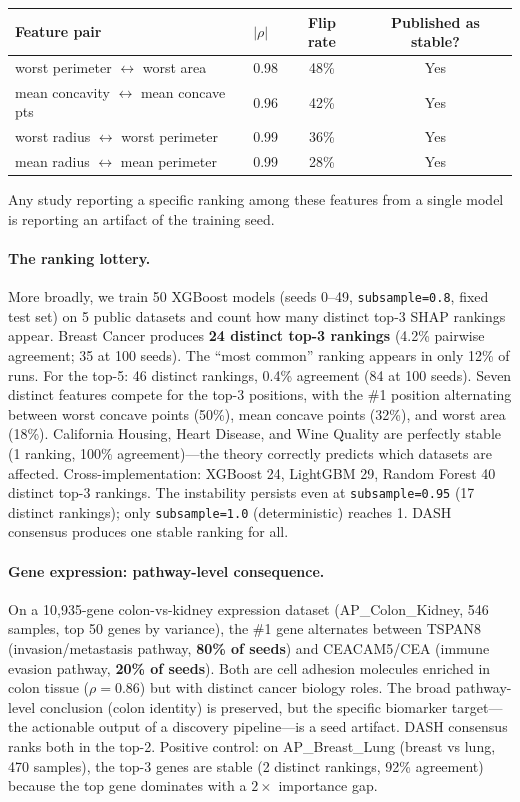 \documentclass{jmlr}
\begin{document}
\begin{center}
\small
\begin{tabular}{@{}llcc@{}}
\toprule
Feature pair & $|\rho|$ & Flip rate & Published as stable? \\
\midrule
worst perimeter $\leftrightarrow$ worst area & 0.98 & 48\% & Yes \\
mean concavity $\leftrightarrow$ mean concave pts & 0.96 & 42\% & Yes \\
worst radius $\leftrightarrow$ worst perimeter & 0.99 & 36\% & Yes \\
mean radius $\leftrightarrow$ mean perimeter & 0.99 & 28\% & Yes \\
\bottomrule
\end{tabular}
\end{center}

Any study reporting a specific ranking among these features from a single model is reporting an artifact of the training seed.

\paragraph{The ranking lottery.}
More broadly, we train 50 XGBoost models (seeds 0--49, \texttt{subsample=0.8}, fixed test set) on 5 public datasets and count how many distinct top-3 SHAP rankings appear. Breast Cancer produces \textbf{24 distinct top-3 rankings} (4.2\% pairwise agreement; 35 at 100 seeds). The ``most common'' ranking appears in only 12\% of runs. For the top-5: 46 distinct rankings, 0.4\% agreement (84 at 100 seeds). Seven distinct features compete for the top-3 positions, with the \#1 position alternating between worst concave points (50\%), mean concave points (32\%), and worst area (18\%). California Housing, Heart Disease, and Wine Quality are perfectly stable (1 ranking, 100\% agreement)---the theory correctly predicts which datasets are affected. Cross-implementation: XGBoost 24, LightGBM 29, Random Forest 40 distinct top-3 rankings. The instability persists even at \texttt{subsample=0.95} (17 distinct rankings); only \texttt{subsample=1.0} (deterministic) reaches 1. DASH consensus produces one stable ranking for all.

\paragraph{Gene expression: pathway-level consequence.}
On a 10{,}935-gene colon-vs-kidney expression dataset (AP\_Colon\_Kidney, 546 samples, top 50 genes by variance), the \#1 gene alternates between TSPAN8 (invasion/metastasis pathway, \textbf{80\% of seeds}) and CEACAM5/CEA (immune evasion pathway, \textbf{20\% of seeds}). Both are cell adhesion molecules enriched in colon tissue ($\rho = 0.86$) but with distinct cancer biology roles. The broad pathway-level conclusion (colon identity) is preserved, but the specific biomarker target---the actionable output of a discovery pipeline---is a seed artifact. DASH consensus ranks both in the top-2. Positive control: on AP\_Breast\_Lung (breast vs lung, 470 samples), the top-3 genes are stable (2 distinct rankings, 92\% agreement) because the top gene dominates with a $2\times$ importance gap.
\end{document}
